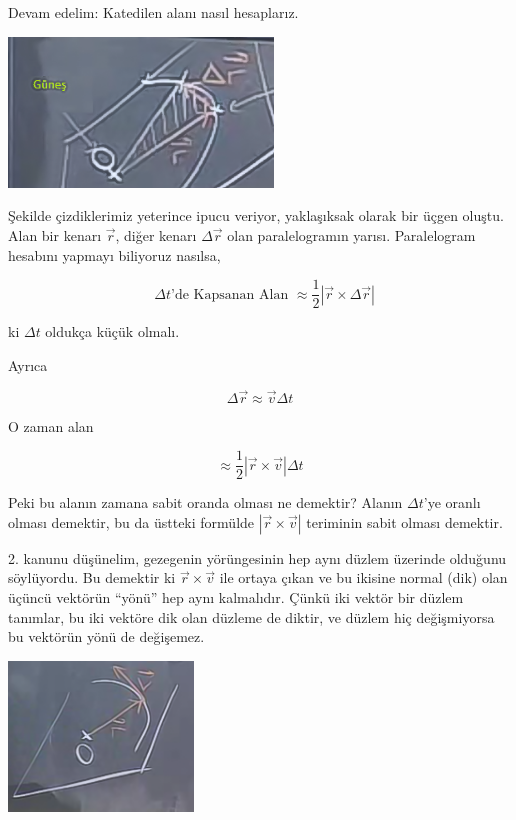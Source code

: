\documentclass[12pt,fleqn]{article}\usepackage{../../common}
\begin{document}
Devam edelim: Katedilen alanı nasıl hesaplarız. 

\begin{center}
\includegraphics[height=4cm]{6_7.png}
\end{center}

Şekilde çizdiklerimiz yeterince ipucu veriyor, yaklaşıksak olarak bir üçgen
oluştu. Alan bir kenarı $\vec{r}$, diğer kenarı $\Delta \vec{r}$ olan
paralelogramın yarısı. Paralelogram hesabını yapmayı biliyoruz nasılsa,

$$ 
\textrm{ $\Delta t$'de Kapsanan Alan } \approx
\frac{1}{2} |\vec{r} \times \Delta \vec{r}| 
$$

ki $\Delta t$ oldukça küçük olmalı. 

Ayrıca

$$ \Delta \vec{r} \approx \vec{v} \Delta t $$

O zaman alan

$$ \approx
\frac{1}{2} |\vec{r} \times \vec{v}| \Delta t
 $$

Peki bu alanın zamana sabit oranda olması ne demektir? Alanın $\Delta t$'ye
oranlı olması demektir, bu da üstteki formülde $|\vec{r} \times \vec{v}|$
teriminin sabit olması demektir.

2. kanunu düşünelim, gezegenin yörüngesinin hep aynı düzlem üzerinde olduğunu
söylüyordu. Bu demektir ki $\vec{r} \times \vec{v}$ ile ortaya çıkan ve bu
ikisine normal (dik) olan üçüncü vektörün ``yönü'' hep aynı kalmalıdır. Çünkü
iki vektör bir düzlem tanımlar, bu iki vektöre dik olan düzleme de diktir, ve
düzlem hiç değişmiyorsa bu vektörün yönü de değişemez.

\begin{center}
\includegraphics[height=4cm]{6_8.png}
\end{center}
\end{document}
